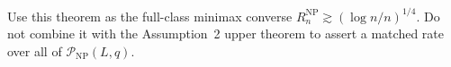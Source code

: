 Use this theorem as the full-class minimax converse \(R_n^{\mathrm{NP}}\gtrsim(\log n/n)^{1/4}\).  Do not combine it with the Assumption~2 upper theorem to assert a matched rate over all of \(\mathcal P_{\mathrm{NP}}(L,q)\).